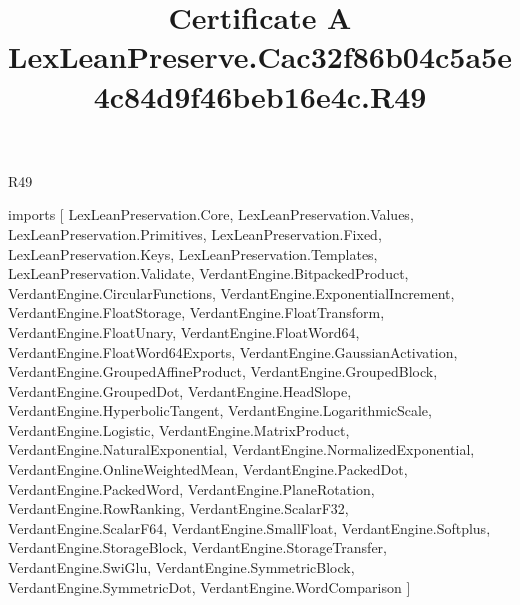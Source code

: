 \begin{lexlean}{R49}
\title{Certificate A LexLeanPreserve.Cac32f86b04c5a5e4c84d9f46beb16e4c.R49}
\begin{coremodule}
imports [
  LexLeanPreservation.Core,
  LexLeanPreservation.Values,
  LexLeanPreservation.Primitives,
  LexLeanPreservation.Fixed,
  LexLeanPreservation.Keys,
  LexLeanPreservation.Templates,
  LexLeanPreservation.Validate,
  VerdantEngine.BitpackedProduct,
  VerdantEngine.CircularFunctions,
  VerdantEngine.ExponentialIncrement,
  VerdantEngine.FloatStorage,
  VerdantEngine.FloatTransform,
  VerdantEngine.FloatUnary,
  VerdantEngine.FloatWord64,
  VerdantEngine.FloatWord64Exports,
  VerdantEngine.GaussianActivation,
  VerdantEngine.GroupedAffineProduct,
  VerdantEngine.GroupedBlock,
  VerdantEngine.GroupedDot,
  VerdantEngine.HeadSlope,
  VerdantEngine.HyperbolicTangent,
  VerdantEngine.LogarithmicScale,
  VerdantEngine.Logistic,
  VerdantEngine.MatrixProduct,
  VerdantEngine.NaturalExponential,
  VerdantEngine.NormalizedExponential,
  VerdantEngine.OnlineWeightedMean,
  VerdantEngine.PackedDot,
  VerdantEngine.PackedWord,
  VerdantEngine.PlaneRotation,
  VerdantEngine.RowRanking,
  VerdantEngine.ScalarF32,
  VerdantEngine.ScalarF64,
  VerdantEngine.SmallFloat,
  VerdantEngine.Softplus,
  VerdantEngine.StorageBlock,
  VerdantEngine.StorageTransfer,
  VerdantEngine.SwiGlu,
  VerdantEngine.SymmetricBlock,
  VerdantEngine.SymmetricDot,
  VerdantEngine.WordComparison
]


\end{coremodule}
\end{lexlean}
